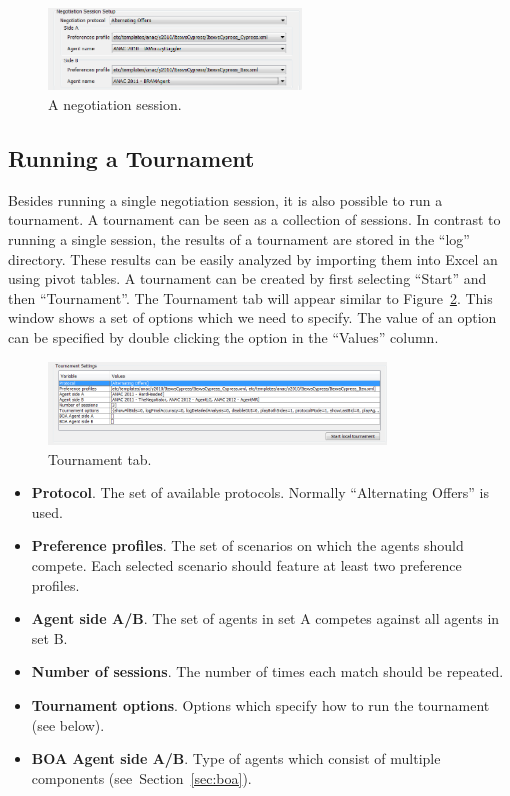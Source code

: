 \documentclass[]{article}
\begin{document}
\begin{figure}[htb]
	\centering
	\includegraphics[width=0.6\textwidth]{media/image11.png}
\caption{A negotiation session.}\label{Fig:session}
\end{figure}


\subsection{Running a Tournament}
Besides running a single negotiation session, it is also possible to run a tournament. A tournament can be seen as a collection of sessions. In contrast to running a single session, the results of a tournament are stored in the ``log'' directory. These results can be easily analyzed by importing them into Excel an using pivot tables. A tournament can be created by first selecting ``Start'' and then ``Tournament''. The Tournament tab will appear similar to Figure~\ref{Fig:tournament}. This window shows a set of options which we need to specify. The value of an option can be specified by double clicking the option in the ``Values'' column.


\begin{figure}[htb]
	\centering
	\includegraphics[width=0.8\textwidth]{media/image16.png}
\caption{Tournament tab.}\label{Fig:tournament}
\end{figure}

\begin{itemize}
	\item \textbf{Protocol}. The set of available protocols. Normally ``Alternating Offers'' is used.
	\item \textbf{Preference profiles}. The set of scenarios on which the agents should compete. Each selected scenario should feature at least two preference profiles.
	\item \textbf{Agent side A/B}. The set of agents in set A competes against all agents in set B.
	\item \textbf{Number of sessions}. The number of times each match should be repeated.
	\item \textbf{Tournament options}. Options which specify how to run the tournament (see below).
	\item \textbf{BOA Agent side A/B}. Type of agents which consist of multiple components (see~Section~\ref{sec:boa}).
\end{itemize}
\end{document}
